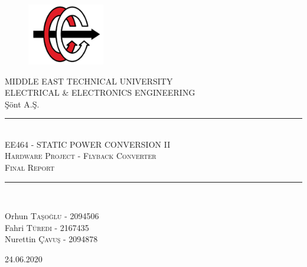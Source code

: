 \begin{titlepage}
\newcommand{\HRule}{\rule{\linewidth}{0.5mm}}
\setlength{\topmargin}{0 in}
\begin{center}

\begin{figure}[!h]
\centering
\includegraphics [width=0.3\textwidth]{eelogo.png}
\end{figure}

\vspace{10mm}
\Huge{MIDDLE EAST TECHNICAL UNIVERSITY}\\
\vspace{5mm}
{\LARGE ELECTRICAL \& ELECTRONICS ENGINEERING}\\
\vspace{4mm}
\LARGE{Şönt A.Ş.}\\

\HRule\\[0.4cm]
\textsc{\Large{EE464 - STATIC POWER CONVERSION II}}\\
\textsc{\Large{Hardware Project - Flyback Converter\\}}
\textsc{\Large{Final Report\\}}
\HRule\\[0.4cm]

\vspace{3mm}

\end{center}
\begin{minipage}{1\textwidth}
		\begin{flushleft}
			\large
			Orhun  \textsc{Taşoğlu - 2094506}\\
			Fahri \textsc{Türedi - 2167435}\\
			Nurettin \textsc{Çavuş - 2094878}
			
		\end{flushleft}
	\end{minipage}

\vspace{10mm}
\begin{center}
\large{24.06.2020}
\end{center}
\end{titlepage}